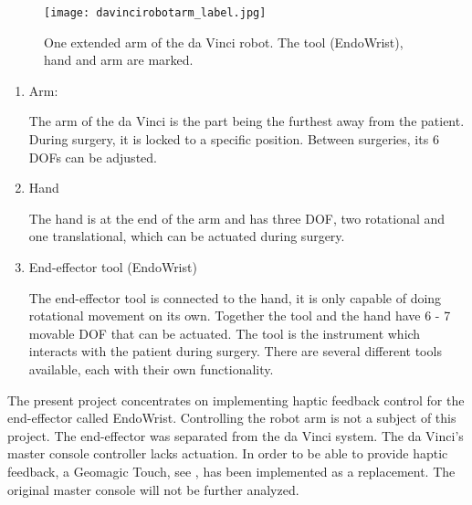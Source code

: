 \begin{figure}[H]
	\centering
		\centering
		\texttt{[image: davincirobotarm\_label.jpg]}
		\caption{One extended arm of the da Vinci robot. The tool (EndoWrist), hand and arm are marked.}
		\label{fig:davinciarmrobot}
\end{figure}


\begin{enumerate}
\item Arm:

The arm of the da Vinci is the part being the furthest away from the patient. 
During surgery, it is locked to a specific position. Between surgeries, its 6 \gls{DOF}s can be adjusted.
\item Hand

The hand is at the end of the arm and has three \gls{DOF}, two rotational and one translational, which can be actuated during surgery. 
\item End-effector tool (EndoWrist)

The end-effector tool is connected to the hand, it is only capable of doing rotational movement on its own. Together the tool and the hand have 6 - 7 movable \gls{DOF} that can be actuated. The tool is the instrument which interacts with the patient during surgery. There are several different tools available, each with their own functionality. 
\end{enumerate}

The present project concentrates on implementing haptic feedback control for the end-effector called EndoWrist. Controlling the robot arm is not a subject of this project. The end-effector was separated from the da Vinci system.
The da Vinci's master console controller lacks actuation. In order to be able to provide haptic feedback, a Geomagic Touch, see , has been implemented as a replacement. The original master console will not be further analyzed. 